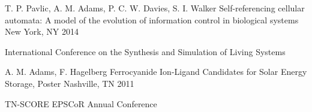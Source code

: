 \begin{cventries}
\cventry
    {T. P. Pavlic, \textcolor{cmyk-magenta}{A. M. Adams}, P. C. W. Davies, S. I. Walker}
    {Self-referencing cellular automata: A model of the evolution of information control in biological systems}
    {New York, NY}
    {2014}
    {
      \begin{cvitems}
        \item {International Conference on the Synthesis and Simulation of Living Systems}
      \end{cvitems}
    }
    
\cventry
    {\textcolor{cmyk-magenta}{A. M. Adams}, F. Hagelberg}
    {Ferrocyanide Ion-Ligand Candidates for Solar Energy Storage, Poster}
    {Nashville, TN}
    {2011}
    {
      \begin{cvitems}
        \item {TN-SCORE EPSCoR Annual Conference}
      \end{cvitems}
    }
    
\end{cventries}